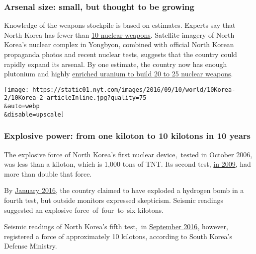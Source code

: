 \hypertarget{arsenal-size-small-but-thought-to-be-growing}{%
\subsubsection{\texorpdfstring{\textbf{Arsenal size: small, but thought
to be
growing}}{Arsenal size: small, but thought to be growing}}\label{arsenal-size-small-but-thought-to-be-growing}}

Knowledge of the weapons stockpile is based on estimates. Experts say
that North Korea has fewer than
\href{https://www.nytimes.com/interactive/2016/12/23/world/nuclear-weapon-countries.html}{10
nuclear weapons}. Satellite imagery of North Korea's nuclear complex in
Yongbyon, combined with official North Korean propaganda photos and
recent nuclear tests, suggests that the country could rapidly expand its
arsenal. By one estimate, the country now has enough plutonium and
highly
\href{https://www.nytimes.com/2017/01/12/opinion/the-us-must-talk-to-north-korea.html}{enriched
uranium to build 20 to 25 nuclear weapons}.

\texttt{[image: https://static01.nyt.com/images/2016/09/10/world/10Korea-2/10Korea-2-articleInline.jpg?quality=75\\\&auto=webp\\\&disable=upscale]}

\hypertarget{explosive-power-from-one-kiloton-to-10-kilotons-in-10-years}{%
\subsubsection{\texorpdfstring{\textbf{Explosive power: from one kiloton
to 10 kilotons in 10
years}}{Explosive power: from one kiloton to 10 kilotons in 10 years}}\label{explosive-power-from-one-kiloton-to-10-kilotons-in-10-years}}

The explosive force of North Korea's first nuclear
device,~\href{http://www.nytimes.com/2006/10/09/world/asia/09korea.html}{tested
in October 2006}, was less than a kiloton, which is 1,000 tons of TNT.
Its second test,
\href{http://www.nytimes.com/2009/05/25/world/asia/25nuke.html}{in
2009}, had more than double that force.

By
\href{https://www.nytimes.com/2016/01/06/world/asia/north-korea-hydrogen-bomb-test.html}{January
2016}, the country claimed to have exploded a hydrogen bomb in a fourth
test, but outside monitors expressed skepticism. Seismic readings
suggested an explosive force~of~four~to~six kilotons.

Seismic readings of North Korea's fifth test,~in
\href{https://www.nytimes.com/2016/09/10/world/asia/north-korea-nuclear-weapons-tests.html}{September
2016}, however, registered a force of approximately 10 kilotons,
according to South Korea's Defense Ministry.

